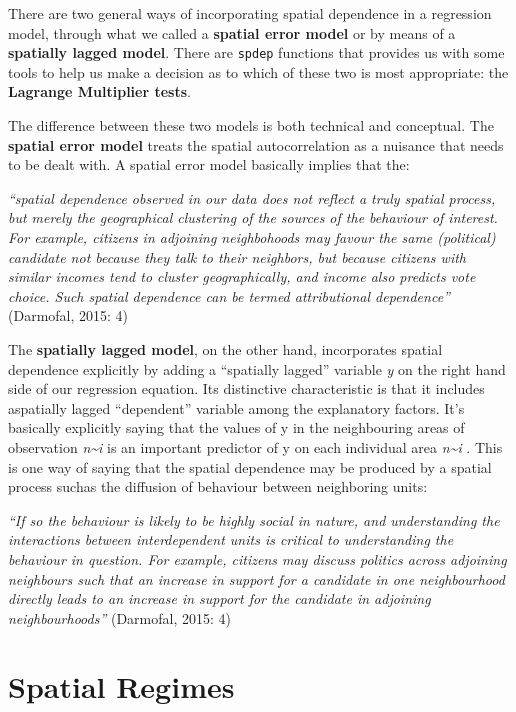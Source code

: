 \documentclass[]{book}
\begin{document}
There are two general ways of incorporating spatial dependence in a regression model, through what we called a \textbf{spatial error model} or by means of a \textbf{spatially lagged model}. There are \texttt{spdep} functions that provides us with some tools to help us make a decision as to which of these two is most appropriate: the \textbf{Lagrange Multiplier tests}.

The difference between these two models is both technical and conceptual. The \textbf{spatial error model} treats the spatial autocorrelation as a nuisance that needs to be dealt with. A spatial error model basically implies that the:

\emph{``spatial dependence observed in our data does not reflect a truly spatial process, but merely the geographical clustering of the sources of the behaviour of interest. For example, citizens in adjoining neighbohoods may favour the same (political) candidate not because they talk to their neighbors, but because citizens with similar incomes tend to cluster geographically, and income also predicts vote choice. Such spatial dependence can be termed attributional dependence''} (Darmofal, 2015: 4)

The \textbf{spatially lagged model}, on the other hand, incorporates spatial dependence explicitly by adding a ``spatially lagged'' variable \emph{y} on the right hand side of our regression equation. Its distinctive characteristic is that it includes aspatially lagged ``dependent'' variable among the explanatory factors. It's basically explicitly saying that the values of y in the neighbouring areas of observation \emph{n\textasciitilde{}i} is an important predictor of y on each individual area \emph{n\textasciitilde{}i} . This is one way of saying that the spatial dependence may be produced by a spatial process suchas the diffusion of behaviour between neighboring units:

\emph{``If so the behaviour is likely to be highly social in nature, and understanding the interactions between interdependent units is critical to understanding the behaviour in question. For example, citizens may discuss politics across adjoining neighbours such that an increase in support for a candidate in one neighbourhood directly leads to an increase in support for the candidate in adjoining neighbourhoods''} (Darmofal, 2015: 4)

\hypertarget{spatial-regimes}{%
\section{Spatial Regimes}\label{spatial-regimes}}
\end{document}
